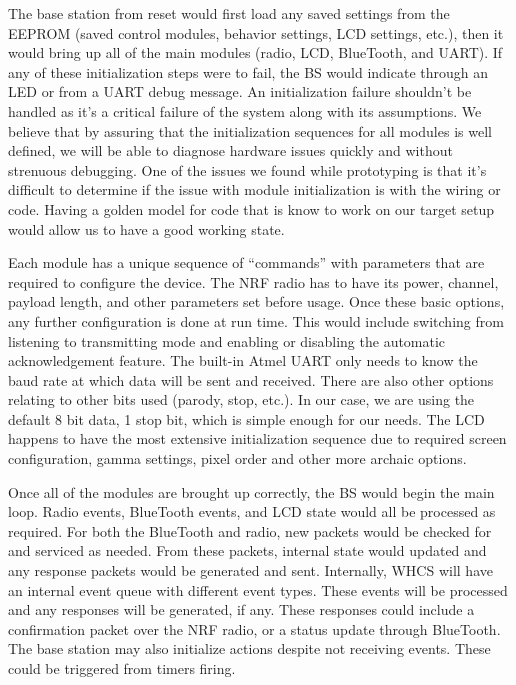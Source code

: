 The base station from reset would first load any saved settings from the
EEPROM (saved control modules, behavior settings, LCD settings, etc.), then it
would bring up all of the main modules (radio, LCD, BlueTooth, and UART). If
any of these initialization steps were to fail, the BS would indicate through
an LED or from a UART debug message. An initialization failure shouldn't be
handled as it's a critical failure of the system along with its assumptions. We
believe that by assuring that the initialization sequences for all modules is
well defined, we will be able to diagnose hardware issues quickly and without
strenuous debugging. One of the issues we found while prototyping is that it's
difficult to determine if the issue with module initialization is with the
wiring or code. Having a golden model for code that is know to work on our
target setup would allow us to have a good working state.

Each module has a unique sequence of ``commands'' with parameters that are
required to configure the device. The NRF radio has to have its power, channel,
payload length, and other parameters set before usage. Once these basic
options, any further configuration is done at run time. This would include
switching from listening to transmitting mode and enabling or disabling the
automatic acknowledgement feature. The built-in Atmel UART only needs to know
the baud rate at which data will be sent and received. There are also other
options relating to other bits used (parody, stop, etc.). In our case, we are
using the default 8 bit data, 1 stop bit, which is simple enough for our needs.
The LCD happens to have the most extensive initialization sequence due to
required screen configuration, gamma settings, pixel order and other more
archaic options.

Once all of the modules are brought up correctly, the BS would begin the main loop.
Radio events, BlueTooth events, and LCD state would all be processed as
required. For both the BlueTooth and radio, new packets would be checked for
and serviced as needed. From these packets, internal state would updated and any
response packets would be generated and sent. Internally, WHCS will have an
internal event queue with different event types. These events will be processed
and any responses will be generated, if any. These responses could include a
confirmation packet over the NRF radio, or a status update through BlueTooth.
The base station may also initialize actions despite not receiving events.
These could be triggered from timers firing.

